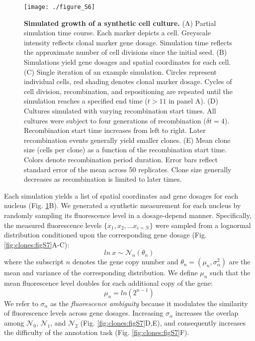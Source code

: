 \begin{figure}[h]
\texttt{[image: ./figure\_S6]}
\caption[Simulated growth of a synthetic cell culture.]{\textbf{Simulated growth of a synthetic cell culture.} (A) Partial simulation time course. Each marker depicts a cell. Greyscale intensity reflects clonal marker gene dosage. Simulation time reflects the approximate number of cell divisions since the initial seed. (B) Simulations yield gene dosages and spatial coordinates for each cell. (C) Single iteration of an example simulation. Circles represent individual cells, red shading denotes clonal marker dosage. Cycles of cell division, recombination, and repositioning are repeated until the simulation reaches a specified end time ($t>11$ in panel A). (D) Cultures simulated with varying recombination start times. All cultures were subject to four generations of recombination ($\delta t=4$). Recombination start time increases from left to right. Later recombination events generally yield smaller clones. (E) Mean clone size (cells per clone) as a function of the recombination start time. Colors denote recombination period duration. Error bars reflect standard error of the mean across 50 replicates. Clone size generally decreases as recombination is limited to later times.}
\label{fig:clones:figS6}
\end{figure}

Each simulation yields a list of spatial coordinates and gene dosages for each nucleus (Fig. \ref{fig:clones:figS6}B). We generated a synthetic measurement for each nucleus by randomly sampling its fluorescence level in a dosage-depend manner. Specifically, the measured fluorescence levels $\{x_1, x_2, \ldots x_{i=N} \}$ were sampled from a lognormal distribution conditioned upon the corresponding gene dosage (Fig. \ref{fig:clones:figS7}A-C):
\begin{equation}
ln\ x \sim \mathcal{N}_n(\theta _n)
\end{equation}
where the subscript $n$ denotes the gene copy number and $\theta_n = (\mu_n,\sigma_{\alpha}^2)$ are the mean and variance of the corresponding distribution. We define $\mu_n$ such that the mean fluorescence level doubles for each additional copy of the gene:
\begin{equation}
\mu_{n } = ln(2^{n-1})
\end{equation}
We refer to $\sigma_{\alpha}$ as the \emph{fluorescence ambiguity} because it modulates the similarity of fluorescence levels across gene dosages. Increasing $\sigma_{\alpha}$ increases the overlap among $\mathcal{N}_0$, $\mathcal{N}_1$, and $\mathcal{N}_2$ (Fig. \ref{fig:clones:figS7}D,E), and consequently increases the difficulty of the annotation task (Fig. \ref{fig:clones:figS7}F).

